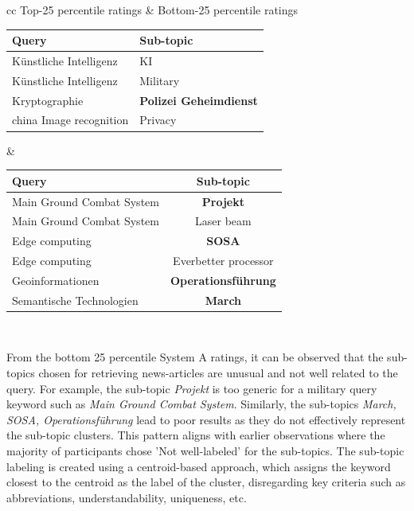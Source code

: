 \begin{center}
	\label{tab:queries_question_234}
	\begin{tabular}{ cc }   %
		Top-25 percentile ratings & Bottom-25 percentile ratings \\  
		\begin{tabularx}{.4\textwidth}{|Y|Y|}
			\hline
			Query  & Sub-topic \\
			\hline
			Künstliche Intelligenz & KI  \\
			\hline
			Künstliche Intelligenz & Military \\
			\hline
			Kryptographie & \textbf{Polizei Geheimdienst}\\
			\hline
			china Image recognition & Privacy \\
			\hline
		\end{tabularx}&  %
		\begin{tabularx}{.55\textwidth}{|Y|c|}
			\hline
			Query  & Sub-topic \\
			\hline
			Main Ground Combat System & \textbf{Projekt}  \\
			\hline
			Main Ground Combat System & Laser beam \\
			\hline
			Edge computing & \textbf{SOSA} \\
			\hline
			Edge computing & Everbetter processor \\
			\hline
			Geoinformationen & \textbf{Operationsführung} \\
			\hline
			Semantische Technologien & \textbf{March} \\
			\hline
		\end{tabularx}\\
	\end{tabular}
\end{center}

From the bottom 25 percentile System A ratings, it can be observed that the sub-topics chosen for retrieving news-articles are unusual and not well related to the query. For example, the sub-topic \textit{Projekt} is too generic for a military query keyword such as \textit{Main Ground Combat System}. Similarly, the sub-topics \textit{March, SOSA, Operationsführung} lead to poor results as they do not effectively represent the sub-topic clusters. This pattern aligns with earlier observations where the majority of participants chose 'Not well-labeled' for the sub-topics. The sub-topic labeling is created using a centroid-based approach, which assigns the keyword closest to the centroid as the label of the cluster, disregarding key criteria such as abbreviations, understandability, uniqueness, etc.

